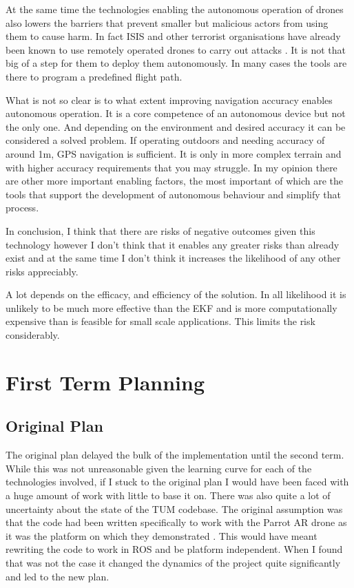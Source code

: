 \documentclass[]{../resources/final_report}
\begin{document}
At the same time the technologies enabling the autonomous operation of drones also lowers the barriers 
that prevent smaller but malicious actors from using them to cause harm. In fact ISIS and other terrorist 
organisations have already been known to use remotely operated drones to carry out attacks \cite{something}. 
It is not that big of a step for them to deploy them autonomously. In many cases the tools are there to 
program a predefined flight path.

What is not so clear is to what extent improving navigation accuracy enables autonomous operation. 
It is a core competence of an autonomous device \cite{rttas} but not the only one. And depending on the 
environment and desired accuracy it can be considered a solved problem. If operating outdoors and 
needing accuracy of around 1m, GPS navigation is sufficient. It is only in more complex terrain and 
with higher accuracy requirements that you may struggle. In my opinion there are other more important 
enabling factors, the most important of which are the tools that support the development of autonomous 
behaviour and simplify that process.

In conclusion, I think that there are risks of negative outcomes given this technology however I don’t 
think that it enables any greater risks than already exist and at the same time I don’t think it increases 
the likelihood of any other risks appreciably.

A lot depends on the efficacy, and efficiency of the solution. In all likelihood it is unlikely to be 
much more effective than the EKF and is more computationally expensive than is feasible for small scale 
applications. This limits the risk considerably.





\chapter{First Term Planning}

\section{Original Plan}

The original plan delayed the bulk of the implementation until the second term. While this was 
not unreasonable given the learning curve for each of the technologies involved, if I stuck to 
the original plan I would have been faced with a huge amount of work with little to base it on.
There was also quite a lot of uncertainty about the state of the TUM codebase. The original 
assumption was that the code had been written specifically to work with the Parrot AR drone as 
it was the platform on which they demonstrated \cite{Engel:Camera-basedNav}.
This would have meant rewriting the code to work in ROS and be platform independent. When I found 
that was not the case it changed the dynamics of the project quite significantly and led to the 
new plan.
\end{document}

